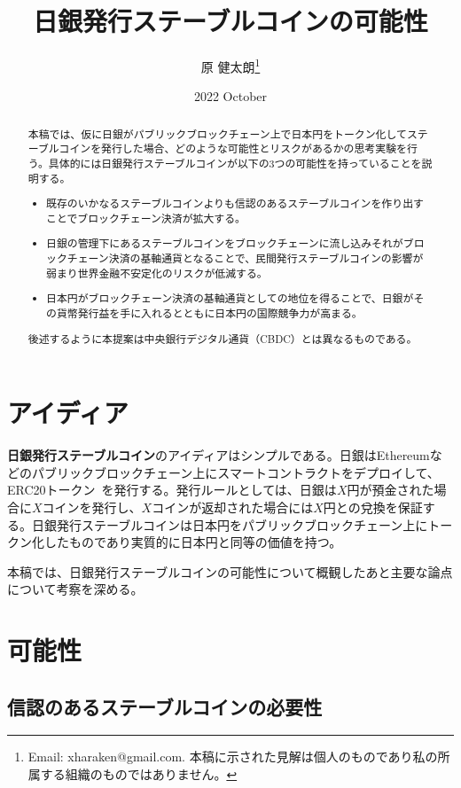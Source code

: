 \documentclass[dvipdfmx,a4paper]{jsarticle}
\title{\textbf{日銀発行ステーブルコインの可能性}}
\author{原 健太朗\footnote{Email: xharaken@gmail.com. 本稿に示された見解は個人のものであり私の所属する組織のものではありません。}}
\date{2022 October}
\begin{document}
\maketitle

\begin{abstract}

本稿では、仮に日銀がパブリックブロックチェーン上で日本円をトークン化してステーブルコインを発行した場合、どのような可能性とリスクがあるかの思考実験を行う。具体的には日銀発行ステーブルコインが以下の3つの可能性を持っていることを説明する。

\begin{itemize}
\item 既存のいかなるステーブルコインよりも信認のあるステーブルコインを作り出すことでブロックチェーン決済が拡大する。
\item 日銀の管理下にあるステーブルコインをブロックチェーンに流し込みそれがブロックチェーン決済の基軸通貨となることで、民間発行ステーブルコインの影響が弱まり世界金融不安定化のリスクが低減する。
\item 日本円がブロックチェーン決済の基軸通貨としての地位を得ることで、日銀がその貨幣発行益を手に入れるとともに日本円の国際競争力が高まる。
\end{itemize}

後述するように本提案は中央銀行デジタル通貨（CBDC）とは異なるものである。

\end{abstract}

\section{アイディア}

\textbf{日銀発行ステーブルコイン}のアイディアはシンプルである。日銀はEthereumなどのパブリックブロックチェーン上にスマートコントラクトをデプロイして、ERC20トークン~\cite{erc20token}を発行する。発行ルールとしては、日銀は$X$円が預金された場合に$X$コインを発行し、$X$コインが返却された場合には$X$円との兌換を保証する。日銀発行ステーブルコインは日本円をパブリックブロックチェーン上にトークン化したものであり実質的に日本円と同等の価値を持つ。

本稿では、日銀発行ステーブルコインの可能性について概観したあと主要な論点について考察を深める。

\section{可能性}

\subsection{信認のあるステーブルコインの必要性}
\end{document}
